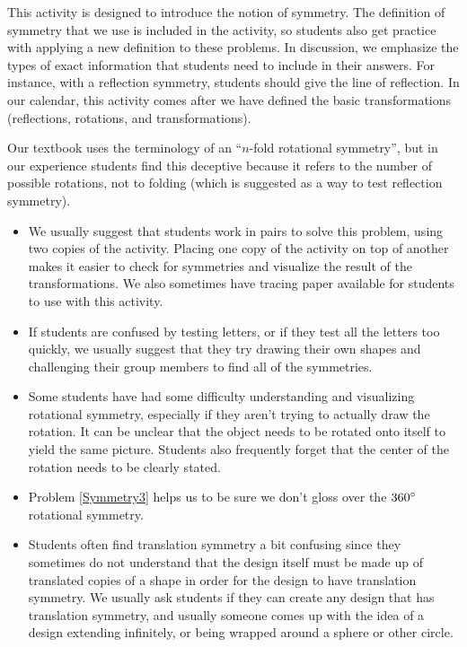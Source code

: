 \documentclass{ximera}
\begin{document}
\newpage
\begin{instructorNotes}
This activity is designed to introduce the notion of symmetry.  The definition of symmetry that we use is included in the activity, so students also get practice with applying a new definition to these problems.  In discussion, we emphasize the types of exact information that students need to include in their answers.  For instance, with a reflection symmetry, students should give the line of reflection.  In our calendar, this activity comes after we have defined the basic transformations (reflections, rotations, and transformations).

Our textbook uses the terminology of an ``$n$-fold rotational symmetry'', but in our experience students find this deceptive because it refers to the number of possible rotations, not to folding (which is suggested as a way to test reflection symmetry).  

\begin{itemize}
    \item We usually suggest that students work in pairs to solve this problem, using two copies of the activity.  Placing one copy of the activity on top of another makes it easier to check for symmetries and visualize the result of the transformations.  We also sometimes have tracing paper available for students to use with this activity.
    \item If students are confused by testing letters, or if they test all the letters too quickly, we usually suggest that they try drawing their own shapes and challenging their group members to find all of the symmetries.
    \item Some students have had some difficulty understanding and visualizing rotational symmetry, especially if they aren't trying to actually draw the rotation.  It can be unclear that the object needs to be rotated onto itself to yield the same picture.  Students also frequently forget that the center of the rotation needs to be clearly stated.
    \item Problem \ref{Symmetry3} helps us to be sure we don't gloss over the $360\degree$ rotational symmetry.
    \item Students often find translation symmetry a bit confusing since they sometimes do not understand that the design itself must be made up of translated copies of a shape in order for the design to have translation symmetry.  We usually ask students if they can create any design that has translation symmetry, and usually someone comes up with the idea of a design extending infinitely, or being wrapped around a sphere or other circle.


\end{itemize}



\end{instructorNotes}
\end{document}

